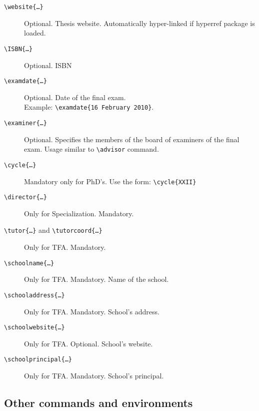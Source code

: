 \documentclass[a5paper,11pt]{article}
\newcommand{\bs}{\textbackslash}
\begin{document}
\begin{description}
\item[\texttt{\bs website\{\dots\}}] Optional. Thesis website. Automatically 
hyper-linked if \textsf{hyperref} package is loaded.

\item[\texttt{\bs ISBN\{\dots\}}] Optional. ISBN

\item[\texttt{\bs examdate\{\dots\}}] Optional. Date of the final exam.\\
Example: \texttt{\bs examdate\{16 February 2010\}}.

\item[\texttt{\bs examiner\{\dots\}}] Optional. Specifies the members of the
board of examiners of the final exam. Usage similar to \texttt{\bs advisor} command.

\item[\texttt{\bs cycle\{\dots\}}] Mandatory only for PhD's. Use the form: \texttt{\bs cycle\{XXII\}}

\item[\texttt{\bs director\{\dots\}}] Only for Specialization. Mandatory.

\item[\texttt{\bs tutor\{\dots\}} and \texttt{\bs tutorcoord\{\dots\}}] Only for TFA. Mandatory.

\item[\texttt{\bs schoolname\{\dots\}}] Only for TFA. Mandatory. Name of the school.
\item[\texttt{\bs schooladdress\{\dots\}}] Only for TFA. Mandatory. School's address.
\item[\texttt{\bs schoolwebsite\{\dots\}}] Only for TFA. Optional. School's website.
\item[\texttt{\bs schoolprincipal\{\dots\}}] Only for TFA. Mandatory. School's principal.

\end{description}



\subsection[Other commands\\ and environments]{Other commands and environments}
\end{document}
